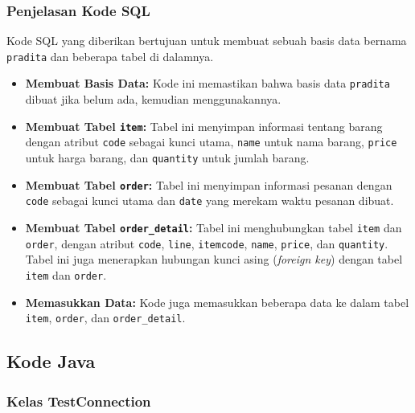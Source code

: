 \subsubsection{Penjelasan Kode SQL}

Kode SQL yang diberikan bertujuan untuk membuat sebuah basis data bernama \texttt{pradita} dan beberapa tabel di dalamnya. 

\begin{itemize}
	\item \textbf{Membuat Basis Data:} Kode ini memastikan bahwa basis data \texttt{pradita} dibuat jika belum ada, kemudian menggunakannya.
	\item \textbf{Membuat Tabel \texttt{item}:} Tabel ini menyimpan informasi tentang barang dengan atribut \texttt{code} sebagai kunci utama, \texttt{name} untuk nama barang, \texttt{price} untuk harga barang, dan \texttt{quantity} untuk jumlah barang.
	\item \textbf{Membuat Tabel \texttt{order}:} Tabel ini menyimpan informasi pesanan dengan \texttt{code} sebagai kunci utama dan \texttt{date} yang merekam waktu pesanan dibuat.
	\item \textbf{Membuat Tabel \texttt{order\_detail}:} Tabel ini menghubungkan tabel \texttt{item} dan \texttt{order}, dengan atribut \texttt{code}, \texttt{line}, \texttt{itemcode}, \texttt{name}, \texttt{price}, dan \texttt{quantity}. Tabel ini juga menerapkan hubungan kunci asing (\textit{foreign key}) dengan tabel \texttt{item} dan \texttt{order}.
	\item \textbf{Memasukkan Data:} Kode juga memasukkan beberapa data ke dalam tabel \texttt{item}, \texttt{order}, dan \texttt{order\_detail}.
\end{itemize}

\subsection{Kode Java}

\subsubsection{Kelas TestConnection}

